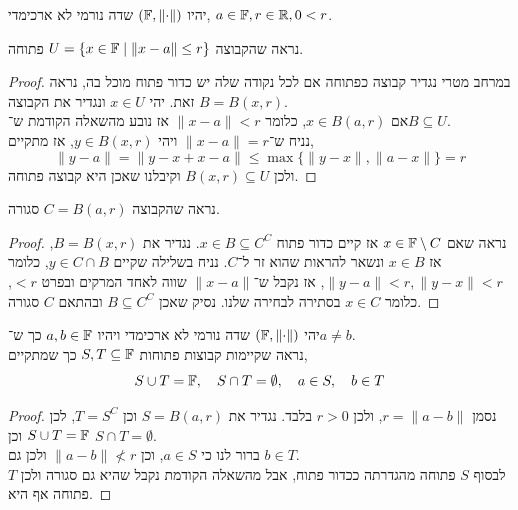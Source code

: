 \question{}
יהיו $(\mathbb{F}, \lVert \cdot \rVert)$ שדה נורמי לא ארכימדי, $a \in \mathbb{F}, r \in \mathbb{R}, 0 < r$.

\subquestion{}
נראה שהקבוצה $U = \{ x \in \mathbb{F} \mid \lVert x - a \rVert \le r \}$ פתוחה.
\begin{proof}
	במרחב מטרי נגדיר קבוצה כפתוחה אם לכל נקודה שלה יש כדור פתוח מוכל בה, נראה זאת.
	יהי $x \in U$ ונגדיר את הקבוצה $B = B(x, r)$. \\
	אם $x \in B(a, r)$, כלומר $\lVert x - a \rVert < r$ אז נובע מהשאלה הקודמת ש־$B \subseteq U$. \\
	נניח ש־$\lVert x - a \rVert = r$ ויהי $y \in B(x, r)$, אז מתקיים,
	\[
		\lVert y - a \rVert
		= \lVert y - x + x - a \rVert
		\le \max\{ \lVert y - x \rVert, \lVert a - x \rVert \}
		= r
	\]
	ולכן $B(x, r) \subseteq U$ וקיבלנו שאכן היא קבוצה פתוחה.
\end{proof}

\subquestion{}
נראה שהקבוצה $C = B(a, r)$ סגורה.
\begin{proof}
	נראה שאם $x \in \mathbb{F} \setminus C$ אז קיים כדור פתוח $x \in B \subseteq C^C$.
	נגדיר את $B = B(x, r)$, אז $x \in B$ ונשאר להראות שהוא זר ל־$C$.
	נניח בשלילה שקיים $y \in C \cap B$, כלומר $\lVert y - a \rVert < r, \lVert y - x \rVert < r$, אז נקבל ש־$\lVert x - a \rVert$ שווה לאחד המרקים ובפרט $< r$, כלומר $x \in C$ בסתירה לבחירה שלנו.
	נסיק שאכן $B \subseteq C^C$ ובהתאם $C$ סגורה.
\end{proof}

\question{}
יהי $(\mathbb{F}, \lVert \cdot \rVert)$ שדה נורמי לא ארכימדי ויהיו $a, b \in \mathbb{F}$ כך ש־$a \ne b$. \\
נראה שקיימות קבוצות פתוחות $S, T \subseteq \mathbb{F}$ כך שמתקיים,
\[
	S \cup T = \mathbb{F},
	\quad
	S \cap T = \emptyset,
	\quad
	a \in S,
	\quad
	b \in T
\]
\begin{proof}
	נסמן $r = \lVert a - b \rVert$, ולכן $r > 0$ בלבד.
	נגדיר את $S = B(a, r)$ וכן $T = S^C$, לכן $S \cup T = \mathbb{F}$ וכן $S \cap T = \emptyset$. \\
	ברור לנו כי $a \in S$, וכן $\lVert a - b \rVert \not< r$ ולכן גם $b \in T$. \\
	לבסוף $S$ פתוחה מהגדרתה ככדור פתוח, אבל מהשאלה הקודמת נקבל שהיא גם סגורה ולכן $T$ פתוחה אף היא.
\end{proof}


